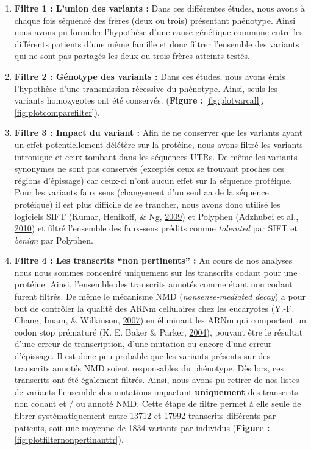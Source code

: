 \documentclass[12pt,twoside]{reedthesis}
\providecommand{\tightlist}{%
  \setlength{\itemsep}{0pt}\setlength{\parskip}{0pt}}
\theoremstyle{definition}
\theoremstyle{definition}
\theoremstyle{remark}
\begin{document}
  \begin{enumerate}
  \def\labelenumi{\arabic{enumi}.}
  \tightlist
  \item
    \textbf{Filtre 1 : L'union des variants :} Dans ces différentes
    études, nous avons à chaque fois séquencé des frères (deux ou trois)
    présentant phénotype. Ainsi nous avons pu formuler l'hypothèse d'une
    cause génétique commune entre les différents patients d'une même
    famille et donc filtrer l'ensemble des variants qui ne sont pas
    partagés les deux ou trois frères atteints testés.\\
  \item
    \textbf{Filtre 2 : Génotype des variants :} Dans ces études, nous
    avons émis l'hypothèse d'une transmission récessive du phénotype.
    Ainsi, seuls les variants homozygotes ont été conservés.
    (\textbf{Figure : }\ref{fig:plotvarcall},
    \ref{fig:plotcomparefilter}).\\
  \item
    \textbf{Filtre 3 : Impact du variant :} Afin de ne conserver que les
    variants ayant un effet potentiellement délétère sur la protéine, nous
    avons filtré les variants intronique et ceux tombant dans les
    séquences UTRs. De même les variants synonymes ne sont pas conservés
    (exceptés ceux se trouvant proches des régions d'épissage) car ceux-ci
    n'ont aucun effet sur la séquence protéique. Pour les variants faux
    sens (changement d'un seul aa de la séquence protéique) il est plus
    difficile de se trancher, nous avons donc utilisé les logiciels SIFT
    (Kumar, Henikoff, \& Ng, \protect\hyperlink{ref-Kumar2009}{2009}) et
    Polyphen (Adzhubei et al., \protect\hyperlink{ref-Adzhubei2010}{2010})
    et filtré l'ensemble des faux-sens prédits comme \emph{tolerated} par
    SIFT et \emph{benign} par Polyphen.\\
  \item
    \textbf{Filtre 4 : Les transcrits ``non pertinents'' :} Au cours de
    nos analyses nous nous sommes concentré uniquement sur les transcrits
    codant pour une protéine. Ainsi, l'ensemble des transcrits annotés
    comme étant non codant furent filtrés. De même le mécanisme NMD
    (\emph{nonsense-mediated decay}) a pour but de contrôler la qualité
    des ARNm cellulaires chez les eucaryotes (Y.-F. Chang, Imam, \&
    Wilkinson, \protect\hyperlink{ref-Chang2007}{2007}) en éliminant les
    ARNm qui comportent un codon stop prématuré (K. E. Baker \& Parker,
    \protect\hyperlink{ref-Baker2004}{2004}), pouvant être le résultat
    d'une erreur de transcription, d'une mutation ou encore d'une erreur
    d'épissage. Il est donc peu probable que les variants présents sur des
    transcrits annotés NMD soient responsables du phénotype. Dès lors, ces
    transcrits ont été également filtrés. Ainsi, nous avons pu retirer de
    nos listes de variants l'ensemble des mutations impactant
    \textbf{uniquement} des transcrits non codant et / ou annoté NMD.
    Cette étape de filtre permet à elle seule de filtrer systématiquement
    entre 13712 et 17992 transcrits différents par patients, soit une
    moyenne de 1834 variants par individus (\textbf{Figure :
    }\ref{fig:plotfilternonpertinanttr}).
  \end{enumerate}
  
\end{document}
